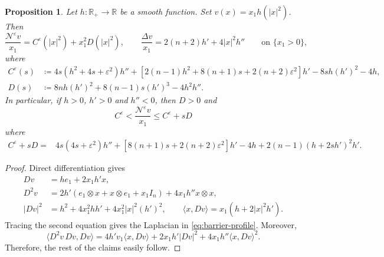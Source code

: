 \documentclass[11pt]{amsart}
\renewcommand{\leq}{\leqslant}
\renewcommand{\ge}{>}
\newcommand{\rr}{{\mathbb{R}}}
\newcommand{\eps}{\varepsilon}
\newcommand{\Ne}{\mathcal N^\eps}
\newtheorem{proposition}[theorem]{Proposition}
\theoremstyle{definition}
\theoremstyle{remark}
\numberwithin{equation}{section}
\begin{document}
\begin{proposition}\label{prop:barrier-profile}
Let $h:\rr_+\to\rr$ be a smooth function. Set $v(x)=x_1h(|x|^2)$. Then 
\begin{equation}\label{eq:barrier-profile}
 \frac{\Ne v}{x_1}=C^\eps(|x|^2)+x_1^2D(|x|^2),\qquad
 \frac{\Delta v}{x_1}=2(n+2)h'+4|x|^2 h''\qquad\text{on } \{x_1\ge 0\},
\end{equation}
where
\begin{align*}
 C^\eps(s)&\coloneqq 4s(h^2+4s+\eps^2)h''
       +[2(n-1)h^2+8(n+1)s+2(n+2)\eps^2]h'
       -8s h(h')^2-4h,\\
 D(s)&\coloneqq 8nh(h')^2+8(n-1)s(h')^3-4h^2h''.
\end{align*}
In particular, if $h>0$, $h'>0$ and $h''<0$, then $D>0$ and 
\begin{equation}
\label{eq:cepsin}
C^\eps<\frac{\Ne v}{x_1}  \leq C^\eps+sD
\end{equation}
where
\begin{equation}\label{eq:barrier-endpoint}
 \begin{split}
 C^\eps+sD={}&4s(4s+\eps^2)h''
       +[8(n+1)s+2(n+2)\eps^2]h'-4h+2(n-1)(h+2s h')^2h'.
 \end{split}
\end{equation}
\end{proposition}
\begin{proof}
Direct differentiation gives
\begin{align*}
 Dv&=he_1+2x_1h'x,\\
 D^2v&=2h'(e_1\otimes x+x\otimes e_1+x_1I_n)+4x_1h''x\otimes x,\\
 |Dv|^2&=h^2+4x_1^2hh'+4x_1^2|x|^2(h')^2,\qquad
 \langle x,Dv\rangle=x_1(h+2|x|^2 h').
\end{align*}
Tracing the second equation gives the Laplacian in \eqref{eq:barrier-profile}. Moreover,
\[
 \langle D^2v\,Dv,Dv\rangle
 =4h'v_1\langle x,Dv\rangle+2x_1h'|Dv|^2
   +4x_1h''\langle x,Dv\rangle^2.
\]
Therefore, the rest of the claims easily follow.
\end{proof}
\end{document}
